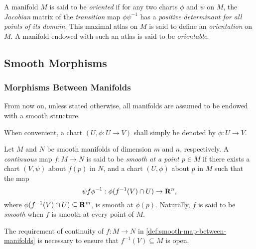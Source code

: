 \begin{definition}[Orientation]
    \label{def:orientation-manifold}
    A manifold \(M\) is said to be \emph{oriented} if for any two charts \(\phi\)
    and \(\psi\) on \(M\), the \emph{Jacobian} matrix of the \emph{transition} map
    \(\phi \psi^{-1}\) has a \emph{positive determinant for all points of its
        domain}. This maximal atlas on \(M\) is said to define an \emph{orientation}
    on \(M\). A manifold endowed with such an atlas is said to be \emph{orientable}.
\end{definition}

\subsection{Smooth Morphisms}

\subsubsection{Morphisms Between Manifolds}

\begin{remark}
    \label{rem:manifolds-convention-are-smooth}
    From now on, unless stated otherwise, all manifolds are assumed to be endowed
    with a smooth structure.
\end{remark}

\begin{remark}
    \label{rem:chart-notation}
    When convenient, a chart \((U, \phi: U \to V)\) shall simply be denoted by
    \(\phi: U \to V\).
\end{remark}

\begin{definition}
    \label{def:smooth-map-between-manifolds}
    Let \(M\) and \(N\) be smooth manifolds of dimension \(m\) and \(n\),
    respectively. A \emph{continuous} map \(f: M \to N\) is said to be \emph{smooth
        at a point \(p \in M\)} if there exists a chart \((V, \psi)\) about \(f(p)\)
    in \(N\), and a chart \((U, \phi)\) about \(p\) in \(M\) such that the map
    \[
        \psi f \phi^{-1}: \phi(f^{-1}(V) \cap U) \to \mathbf{R}^n,
    \]
    where \(\phi(f^{-1}(V) \cap U) \subseteq \mathbf{R}^m\), is smooth at
    \(\phi(p)\). Naturally, \(f\) is said to be \emph{smooth} when \(f\) is smooth
    at every point of \(M\).
\end{definition}

\begin{remark}
    \label{rem:continuous-requirement-in-smooth-map-definition}
    The requirement of continuity of \(f: M \to N\) in
    \cref{def:smooth-map-between-manifolds} is necessary to ensure that
    \(f^{-1}(V) \subseteq M\) is open.
\end{remark}

